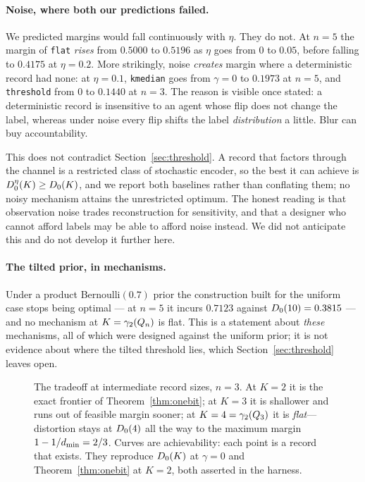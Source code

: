 \paragraph{Noise, where both our predictions failed.}
We predicted margins would fall continuously with $\eta$. They do not. At
$n = 5$ the margin of \texttt{flat} \emph{rises} from $0.5000$ to $0.5196$ as
$\eta$ goes from $0$ to $0.05$, before falling to $0.4175$ at $\eta = 0.2$. More
strikingly, noise \emph{creates} margin where a deterministic record had none: at
$\eta = 0.1$, \texttt{kmedian} goes from $\gamma = 0$ to $0.1973$ at $n=5$, and
\texttt{threshold} from $0$ to $0.1440$ at $n=3$. The reason is visible once
stated: a deterministic record is insensitive to an agent whose flip does not
change the label, whereas under noise every flip shifts the label
\emph{distribution} a little. Blur can buy accountability.

This does not contradict Section~\ref{sec:threshold}. A record that factors
through the channel is a restricted class of stochastic encoder, so the best it
can achieve is $D_0^{\eta}(K) \ge D_0(K)$, and we report both baselines
rather than conflating them; no noisy mechanism attains the unrestricted
optimum. The honest reading is that observation noise trades reconstruction for
sensitivity, and that a designer who cannot afford labels may be able to afford
noise instead. We did not anticipate this and do not develop it further here.

\paragraph{The tilted prior, in mechanisms.}
Under a product Bernoulli$(0.7)$ prior the construction built for the uniform
case stops being optimal --- at $n=5$ it incurs $0.7123$ against $D_0(10) =
0.3815$ --- and no mechanism at $K = \gamma_2(Q_n)$ is flat. This is a statement
about \emph{these} mechanisms, all of which were designed against the uniform
prior; it is not evidence about where the tilted threshold lies, which
Section~\ref{sec:threshold} leaves open.


\begin{figure}[t]
\centering

\caption{The tradeoff at intermediate record sizes, $n = 3$. At $K=2$ it is
the exact frontier of Theorem~\ref{thm:onebit}; at $K=3$ it is shallower and
runs out of feasible margin sooner; at $K = 4 = \gamma_2(Q_3)$ it is
\emph{flat}---distortion stays at $D_0(4)$ all the way to the maximum
margin $1-1/d_{\min} = 2/3$. Curves are achievability: each point is a record
that exists. They reproduce $D_0(K)$ at $\gamma=0$ and Theorem~\ref{thm:onebit} at $K=2$, both asserted in the harness.}
\label{fig:frontierK}
\end{figure}

